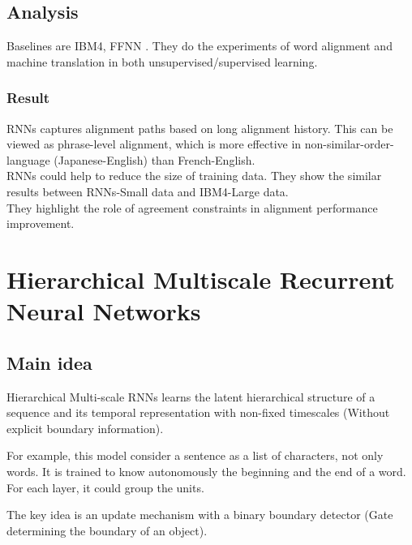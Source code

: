 \documentclass{article}
\begin{document}
\subsection{Analysis} 
Baselines are IBM4, FFNN \citep{Yang13word}. They do the experiments of word alignment and machine translation in both unsupervised/supervised learning.

\subsubsection{Result}
RNNs captures alignment paths based on long alignment history. This can be viewed as phrase-level alignment, which is more effective in non-similar-order-language (Japanese-English) than French-English.\\

RNNs could help to reduce the size of training data. They show the similar results between RNNs-Small data and IBM4-Large data.\\

They highlight the role of agreement constraints in alignment performance improvement.\\




\section{Hierarchical Multiscale Recurrent Neural Networks \citep{Chung2016Hierarchical}}

\subsection{Main idea}
Hierarchical Multi-scale RNNs learns the latent hierarchical structure of a sequence and its temporal representation with non-fixed timescales (Without explicit boundary information).

For example, this model consider a sentence as a list of characters, not only words. It is trained to know autonomously the beginning and the end of a word. For each layer, it could group the units.

The key idea is an update mechanism with a binary boundary detector (Gate determining the boundary of an object).\\
\end{document}
